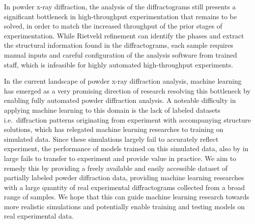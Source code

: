 In powder x-ray diffraction, the analysis of the diffractograms still presents a significant bottleneck
in high-throughput experimentation that remains to be solved, in order to match the increased throughput
of the prior stages of experimentation.
While Rietveld refinement can identify the phases and extract the structural information found
in the diffractograms, each sample requires manual inputs and careful configuration of the analysis software
from trained staff, which is infeasible for highly automated high-throughput experiments.

In the current landscape of powder x-ray diffraction analysis, machine learning has emerged as a very promising direction of research resolving this bottleneck by enabling fully automated powder diffraction analysis.
A noteable difficulty in applying machine learning to this domain is the lack of labeled datasets i.e.\
diffraction patterns originating from experiment with accompanying structure solutions, which has relegated machine learning
researches to training on simulated data.
Since these simulations largely fail to accurately reflect experiment, the performance of models trained
on this simulated data, also by in large fails to transfer to experiment and provide value in practice.
We aim to remedy this by providing a freely available and easily accessible dataset of partially labeled
powder diffraction data, providing machine learning researches with a large quantity of real experimental diffractograms
collected from a broad range of samples.
We hope that this can guide machine learning research towards more realistic
simulations and potentially enable training and testing models on real experimental data.



